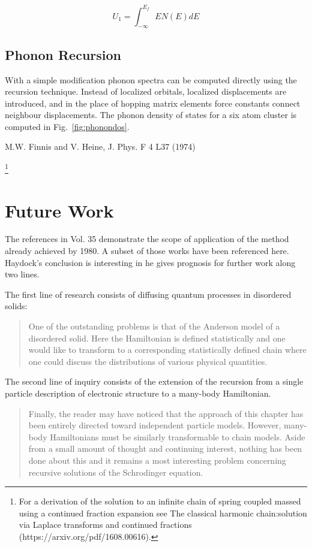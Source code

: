 \begin{equation}
U_{1} = \int_{-\infty}^{E_{f}}EN(E)dE
\end{equation}

\subsection{Phonon Recursion}
With a simple modification phonon spectra can be computed directly using the recursion technique.
Instead of localized orbitals, localized displacements are introduced, and in the place of hopping
matrix elements force constants connect neighbour displacements. The phonon density of states
for a six atom cluster is computed in Fig.~\ref{fig:phonondos}. 

M.W. Finnis and V. Heine, J. Phys. F 4 L37 (1974)

\footnote{For a derivation of the solution to an infinite chain of spring
coupled massed using a continued fraction expansion see 
The classical harmonic chain:solution via Laplace transforms and continued fractions
(https://arxiv.org/pdf/1608.00616).
}

\section{Future Work}
The references in Vol. 35 demonstrate the scope of application of the method 
already achieved by 1980. A subset of those works have been referenced here. 
Haydock's conclusion is interesting in he gives prognosis for further work
along two lines. 

The first line of research consists of diffusing quantum processes in disordered
solids:
%
\begin{quote}
One of the outstanding problems is that of the Anderson model
of a disordered solid. Here the Hamiltonian is defined statistically and
one would like to transform to a corresponding statistically defined chain where
one could discuss the distributions of various physical quantities.
\end{quote}
%

The second line of inquiry consists of the extension of the recursion from a single 
particle description of electronic structure to a many-body Hamiltonian.
%
\begin{quote}
Finally, the reader may have noticed that the approach of this chapter has been entirely directed
toward independent particle models. However, many-body Hamiltonians must be similarly 
transformable to chain models. Aside from a small amount of thought and continuing interest, 
nothing has been done about this and it remains a most interesting problem concerning recursive 
solutions of the Schrodinger equation.
\end{quote}

